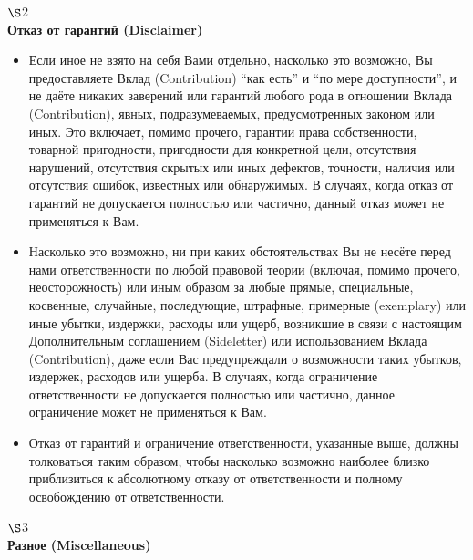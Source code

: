 \begin{center}
$\S$2\\\bfseries
Отказ от гарантий (Disclaimer)
\end{center}
\begin{itemize}
\item[(1)] Если иное не взято на себя Вами отдельно, насколько это возможно, Вы предоставляете Вклад (Contribution) ``как есть'' и ``по мере доступности'', и не даёте никаких заверений или гарантий любого рода в отношении Вклада (Contribution), явных, подразумеваемых, предусмотренных законом или иных. Это включает, помимо прочего, гарантии права собственности, товарной пригодности, пригодности для конкретной цели, отсутствия нарушений, отсутствия скрытых или иных дефектов, точности, наличия или отсутствия ошибок, известных или обнаружимых. В случаях, когда отказ от гарантий не допускается полностью или частично, данный отказ может не применяться к Вам.
\item[(2)] Насколько это возможно, ни при каких обстоятельствах Вы не несёте перед нами ответственности по любой правовой теории (включая, помимо прочего, неосторожность) или иным образом за любые прямые, специальные, косвенные, случайные, последующие, штрафные, примерные (exemplary) или иные убытки, издержки, расходы или ущерб, возникшие в связи с настоящим Дополнительным соглашением (Sideletter) или использованием Вклада (Contribution), даже если Вас предупреждали о возможности таких убытков, издержек, расходов или ущерба. В случаях, когда ограничение ответственности не допускается полностью или частично, данное ограничение может не применяться к Вам.
\item[(3)] Отказ от гарантий и ограничение ответственности, указанные выше, должны толковаться таким образом, чтобы насколько возможно наиболее близко приблизиться к абсолютному отказу от ответственности и полному освобождению от ответственности.
\end{itemize}

\begin{center}
$\S$3\\\bfseries
Разное (Miscellaneous)
\end{center}

